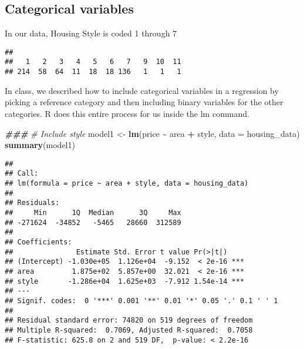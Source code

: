 \documentclass[
]{article}
\newenvironment{Shaded}{\begin{snugshade}}{\end{snugshade}}
\newcommand{\AttributeTok}[1]{\textcolor[rgb]{0.13,0.29,0.53}{#1}}
\newcommand{\CommentTok}[1]{\textcolor[rgb]{0.56,0.35,0.01}{\textit{#1}}}
\newcommand{\DecValTok}[1]{\textcolor[rgb]{0.00,0.00,0.81}{#1}}
\newcommand{\DocumentationTok}[1]{\textcolor[rgb]{0.56,0.35,0.01}{\textbf{\textit{#1}}}}
\newcommand{\FunctionTok}[1]{\textcolor[rgb]{0.13,0.29,0.53}{\textbf{#1}}}
\newcommand{\NormalTok}[1]{#1}
\newcommand{\OtherTok}[1]{\textcolor[rgb]{0.56,0.35,0.01}{#1}}
\newcommand{\SpecialCharTok}[1]{\textcolor[rgb]{0.81,0.36,0.00}{\textbf{#1}}}
\begin{document}
\begin{Shaded}
\end{Shaded}

\subsection{Categorical variables}\label{categorical-variables}

In our data, Housing Style is coded 1 through 7

\begin{Shaded}
\end{Shaded}

\begin{verbatim}
## 
##   1   2   3   4   5   6   7   9  10  11 
## 214  58  64  11  18  18 136   1   1   1
\end{verbatim}

In class, we described how to include categorical variables in a
regression by picking a reference category and then including binary
variables for the other categories. R does this entire process for us
inside the lm command.

\begin{Shaded}
\begin{Highlighting}[]
\DocumentationTok{\#\#\#}
\CommentTok{\# Include style}
\NormalTok{model1 }\OtherTok{\textless{}{-}} \FunctionTok{lm}\NormalTok{(price }\SpecialCharTok{\textasciitilde{}}\NormalTok{ area }\SpecialCharTok{+}\NormalTok{ style, }\AttributeTok{data =}\NormalTok{ housing\_data)}
\FunctionTok{summary}\NormalTok{(model1)}
\end{Highlighting}
\end{Shaded}

\begin{verbatim}
## 
## Call:
## lm(formula = price ~ area + style, data = housing_data)
## 
## Residuals:
##     Min      1Q  Median      3Q     Max 
## -271624  -34852   -5465   28660  312589 
## 
## Coefficients:
##               Estimate Std. Error t value Pr(>|t|)    
## (Intercept) -1.030e+05  1.126e+04  -9.152  < 2e-16 ***
## area         1.875e+02  5.857e+00  32.021  < 2e-16 ***
## style       -1.286e+04  1.625e+03  -7.912 1.54e-14 ***
## ---
## Signif. codes:  0 '***' 0.001 '**' 0.01 '*' 0.05 '.' 0.1 ' ' 1
## 
## Residual standard error: 74820 on 519 degrees of freedom
## Multiple R-squared:  0.7069, Adjusted R-squared:  0.7058 
## F-statistic: 625.8 on 2 and 519 DF,  p-value: < 2.2e-16
\end{verbatim}
\end{document}

